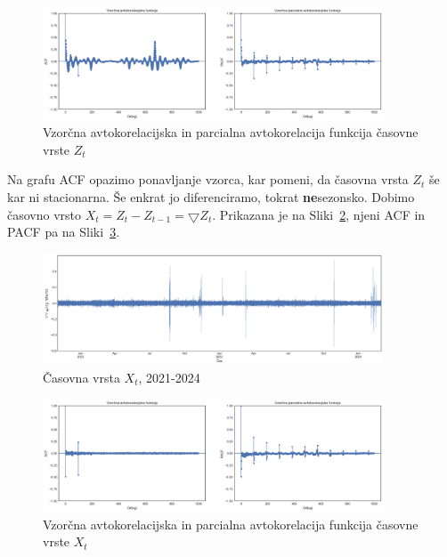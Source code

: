 \documentclass[a4paper, 11pt]{article}
\begin{document}
\begin{figure}[h!]
    \centering
    \caption{Vzorčna avtokorelacijska in parcialna avtokorelacija funkcija časovne vrste $Z_t$}\par\medskip
    \label{fig:ts_diff_acf_pacf}
    \includegraphics[width=0.9\textwidth]{ts_diff_acf_pacf.png}
\end{figure}

\noindent Na grafu ACF opazimo ponavljanje vzorca, kar pomeni, da časovna vrsta $Z_t$ še kar ni stacionarna. 
Še enkrat jo diferenciramo, tokrat \textbf{ne}sezonsko. Dobimo časovno vrsto $X_t = Z_t - Z_{t-1} = \bigtriangledown{Z_t}$. 
Prikazana je na Sliki~\ref{fig:ts_diff_2}, njeni ACF in PACF pa na Sliki~\ref{fig:ts_diff_2_acf_pacf}.

\begin{figure}[h!]
    \centering
    \caption{Časovna vrsta $X_t$, 2021-2024}\par\medskip
    \label{fig:ts_diff_2}
    \includegraphics[width=0.9\textwidth]{ts_diff_2.png}
\end{figure}

\begin{figure}[h!]
    \centering
    \caption{Vzorčna avtokorelacijska in parcialna avtokorelacija funkcija časovne vrste $X_t$}\par\medskip
    \label{fig:ts_diff_2_acf_pacf}
    \includegraphics[width=0.9\textwidth]{ts_diff_2_acf_pacf.png}
\end{figure}
\end{document}
